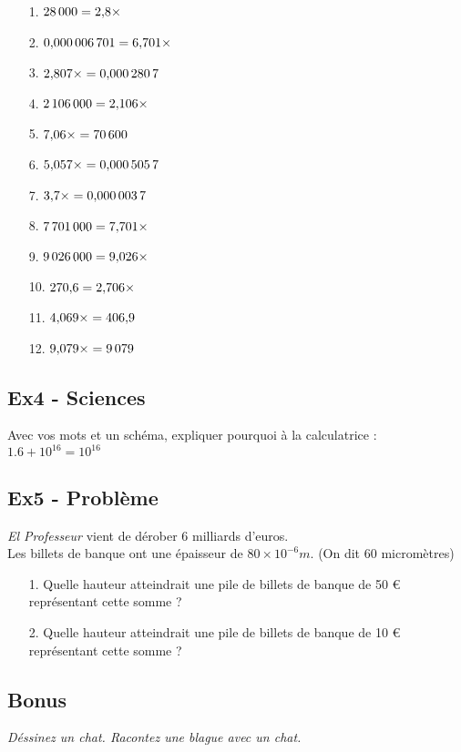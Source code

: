 \documentclass[12pt]{article}
\newcommand{\Pointilles}[1]{%
  \par\nobreak
  \noindent\rule{0pt}{1.5\baselineskip}%
  \multido{}{#1}{\noindent\makebox[\linewidth]{\dotfill}\endgraf}%
  \bigskip%
}
\begin{document}
\begin{multicols}{3}

  \begin{enumerate}
  \item[1.] $28\,000=2{,}8\times\dotfill$
  \item[2.] $0{,}000\,006\,701=6{,}701\times\dotfill$
  \item[3.] $2{,}807\times\dotfill=0{,}000\,280\,7$
  \item[4.] $2\,106\,000=2{,}106\times\dotfill$
  \item[5.] $7{,}06\times\dotfill=70\,600$
  \item[6.] $5{,}057\times\dotfill=0{,}000\,505\,7$
  \item[7.] $3{,}7\times\dotfill=0{,}000\,003\,7$
  \item[8.] $7\,701\,000=7{,}701\times\dotfill$
  \item[9.] $9\,026\,000=9{,}026\times\dotfill$
  \item[10.] $270{,}6=2{,}706\times\dotfill$
  \item[11.] $4{,}069\times\dotfill=406{,}9$
  \item[12.] $9{,}079\times\dotfill=9\,079$
  \end{enumerate}
\end{multicols}


\subsection*{Ex4 - Sciences}

Avec vos mots et un schéma, expliquer pourquoi à la calculatrice : $1.6 + 10^{16} = 10^{16}$ 
\Pointilles{8}

\newpage

\subsection*{Ex5 - Problème}

\textit{\og El Professeur \fg{} } vient de dérober 6 milliards d’euros. \\
Les billets de banque ont une épaisseur de $80 \times 10^{-6} m$. (On dit 60 micromètres)

\begin{itemize}
\item[1.] Quelle hauteur atteindrait une pile de billets de banque de 50 \euro{} représentant cette somme ?
\item[2.] Quelle hauteur atteindrait une pile de billets de banque de 10 \euro{} représentant cette somme ?
\end{itemize}

\Pointilles{20}

\subsection*{Bonus}

\textit{Déssinez un chat. Racontez une blague avec un chat.}
\end{document}
